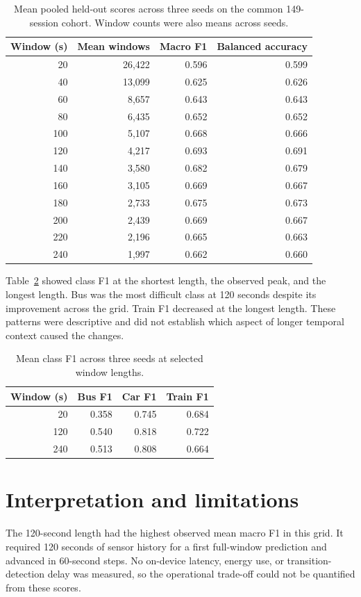 \documentclass[11pt,a4paper]{article}
\begin{document}
\begin{table}[htbp]
\centering
\small
\caption{Mean pooled held-out scores across three seeds on the common
149-session cohort. Window counts were also means across seeds.}
\label{tab:window-grid}
\begin{tabular}{rrrr}
\hline
Window (s) & Mean windows & Macro F1 & Balanced accuracy \\
\hline
20  & 26,422 & 0.596 & 0.599 \\
40  & 13,099 & 0.625 & 0.626 \\
60  & 8,657  & 0.643 & 0.643 \\
80  & 6,435  & 0.652 & 0.652 \\
100 & 5,107  & 0.668 & 0.666 \\
120 & 4,217  & 0.693 & 0.691 \\
140 & 3,580  & 0.682 & 0.679 \\
160 & 3,105  & 0.669 & 0.667 \\
180 & 2,733  & 0.675 & 0.673 \\
200 & 2,439  & 0.669 & 0.667 \\
220 & 2,196  & 0.665 & 0.663 \\
240 & 1,997  & 0.662 & 0.660 \\
\hline
\end{tabular}
\end{table}

Table~\ref{tab:window-classes} showed class F1 at the shortest length, the
observed peak, and the longest length. Bus was the most difficult class at
120 seconds despite its improvement across the grid. Train F1 decreased at
the longest length. These patterns were descriptive and did not establish
which aspect of longer temporal context caused the changes.

\begin{table}[htbp]
\centering
\small
\caption{Mean class F1 across three seeds at selected window lengths.}
\label{tab:window-classes}
\begin{tabular}{rrrr}
\hline
Window (s) & Bus F1 & Car F1 & Train F1 \\
\hline
20  & 0.358 & 0.745 & 0.684 \\
120 & 0.540 & 0.818 & 0.722 \\
240 & 0.513 & 0.808 & 0.664 \\
\hline
\end{tabular}
\end{table}

\section{Interpretation and limitations}
The 120-second length had the highest observed mean macro F1 in this grid.
It required 120 seconds of sensor history for a first full-window prediction
and advanced in 60-second steps. No on-device latency, energy use, or
transition-detection delay was measured, so the operational trade-off could
not be quantified from these scores.
\end{document}

